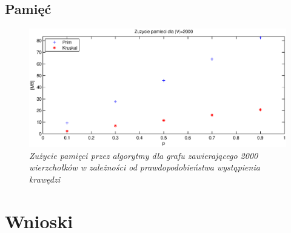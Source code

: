 \documentclass[a4paper, 10pt]{article}
\begin{document}
\subsection{Pamięć}

\begin{figure}[ht!]
\centering
\includegraphics[width=165mm]{wykresy/mem.eps}
\caption{\it{Zużycie pamięci przez algorytmy dla grafu zawierającego 2000 wierzchołków w zależności od prawdopodobieństwa wystąpienia krawędzi}}
\label{overflow}
\end{figure}
\FloatBarrier
\section{Wnioski}






	





\nocite{*}
\renewcommand\refname{\section{Bibliografia}}

\end{document}
